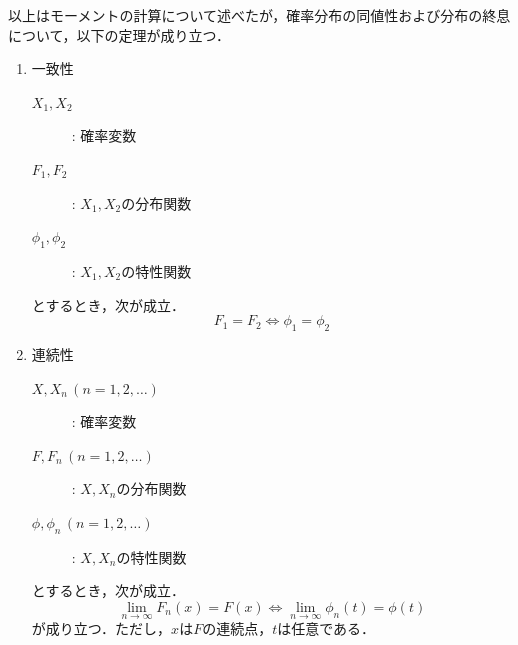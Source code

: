\documentclass{jsreport}
\begin{document}
以上はモーメントの計算について述べたが，確率分布の同値性および分布の終息について，以下の定理が成り立つ．

\begin{screen}
  \begin{theo}
    \begin{enumerate}
      \item 一致性
      \begin{description}
        \item[$X_1, X_2$] : 確率変数
        \item[$F_1, F_2$] : $X_1, X_2$の分布関数
        \item[$\phi_1, \phi_2$] : $X_1, X_2$の特性関数
      \end{description}
      とするとき，次が成立．
      \begin{equation}
        F_1 = F_2 \Longleftrightarrow \phi_1 = \phi_2 \nonumber
      \end{equation}
      \item 連続性
      \begin{description}
        \item[$X, X_n \, (n = 1, 2, \ldots)$] : 確率変数
        \item[$F, F_n \, (n = 1, 2, \ldots)$] : $X, X_n$の分布関数
        \item[$\phi, \phi_n \, (n = 1, 2, \ldots)$] : $X, X_n$の特性関数
      \end{description}
      とするとき，次が成立．
      \begin{equation}
        \lim_{n \to \infty} F_n(x) = F(x) \Longleftrightarrow \lim_{n \to \infty} \phi_n(t) = \phi(t) \nonumber
      \end{equation}
      が成り立つ．ただし，$x$は$F$の連続点，$t$は任意である．
    \end{enumerate}
  \end{theo}
\end{screen}
\end{document}
